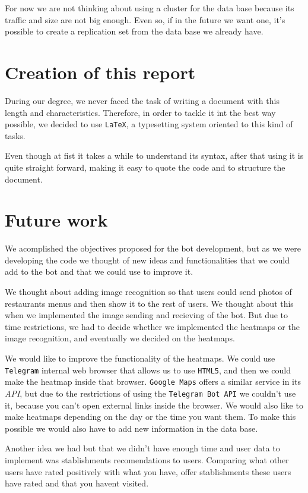 \documentclass[oneside]{memoir}
\begin{document}
For now we are not thinking about using a cluster for the data base because its traffic and size are not big enough. Even so, if in the future we want one, it's possible to create a replication set from the data base we already have.

\section{Creation of this report}
During our degree, we never faced the task of writing a document with this length and characteristics. Therefore, in order to tackle it int the best way possible, we decided to use \texttt{LaTeX}, a typesetting system oriented to this kind of tasks.

Even though at fist it takes a while to understand its syntax, after that using it is quite straight forward, making it easy to quote the code and to structure the document.

\section{Future work}
We acomplished the objectives proposed for the bot development, but as we were developing the code we thought of new ideas and functionalities that we could add to the bot and that we could use to improve it.

We thought about adding image recognition so that users could send photos of restaurants menus and then show it to the rest of users. We thought about this when we implemented the image sending and recieving of the bot. But due to time restrictions, we had to decide whether we implemented the heatmaps or the image recognition, and eventually we decided on the heatmaps.

We would like to improve the functionality of the heatmaps. We could use \texttt{Telegram} internal web browser that allows us to use \texttt{HTML5}, and then we could make the heatmap inside that browser. \texttt{Google Maps} offers a similar service in its \textit{API}, but due to the restrictions of using the \texttt{Telegram Bot API} we couldn't use it, because you can't open external links inside the browser. We would also like to make heatmaps depending on the day or the time you want them. To make this possible we would also have to add new information in the data base.

Another idea we had but that we didn't have enough time and user data to implement was stablishments recomendations to users. Comparing what other users have rated positively with what you have, offer stablishments these users have rated and that you havent visited.
\end{document}
